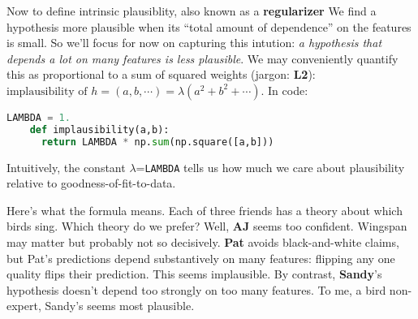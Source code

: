 
  Now to define intrinsic plausiblity, also known as a \textbf{regularizer}
  We find a hypothesis more plausible when its ``total amount of
  dependence'' on the features is small.
  So we'll focus for now on capturing this intution:
  \emph{a hypothesis that depends a lot on many features is less
  plausible}.
  We may conveniently quantify this as
  proportional to a sum of squared weights (jargon: \textbf{L2}):
  $
    \text{implausibility of $h=(a,b, \cdots)$}
    =
    \lambda (a^2 + b^2 + \cdots)
  $.  In code:
  \begin{lstlisting}[language=Python, basicstyle=\footnotesize\ttfamily]
    LAMBDA = 1.
    def implausibility(a,b):
      return LAMBDA * np.sum(np.square([a,b]))
  \end{lstlisting}
  Intuitively, the constant $\lambda$=\texttt{LAMBDA} tells us how much we care
  about plausibility relative to goodness-of-fit-to-data.

  Here's what the formula means.
  Each of three friends has a theory
  about which birds sing.
  Which theory do we prefer?  Well, \textbf{AJ} seems too confident.  Wingspan
  may matter but probably not so decisively.  \textbf{Pat} avoids
  black-and-white claims, but Pat's predictions depend substantively on many
  features: flipping any one quality flips their prediction.  This seems
  implausible.  By contrast, \textbf{Sandy}'s hypothesis doesn't depend too
  strongly on too many features.  To me, a bird non-expert, Sandy's seems most
  plausible.

